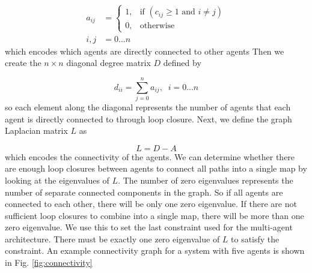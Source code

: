 \documentclass[letterpaper, 10 pt, conference]{ieeeconf}  %
\begin{document}
\begin{align}
  a_{ij} &=
  \begin{cases}
    1, & \text{if } (c_{ij} \geq 1 \text{ and } i \neq j)\\
    0, & \text{otherwise}
  \end{cases}\\
  i,j &=0 ...n \nonumber
\end{align}
%
which encodes which agents are directly connected to other agents
Then we create the $n \times n$ diagonal degree matrix $D$ defined by

\begin{equation}
  d_{ii} = \sum_{j=0}^{n} a_{ij},\;\; i = 0 ... n \nonumber
\end{equation}
%
so each element along the diagonal represents the number of agents that each agent is directly connected to through loop closure. Next, we define the graph Laplacian matrix $L$ as

\begin{equation}
  L = D-A
\end{equation}
%
which encodes the connectivity of the agents. We can determine whether there are enough loop closures between agents to connect all paths into a single map by looking at the eigenvalues of $L$. The number of zero eigenvalues represents the number of separate connected components in the graph. So if all agents are connected to each other, there will be only one zero eigenvalue. If there are not sufficient loop closures to combine into a single map, there will be more than one zero eigenvalue. We use this to set the last constraint used for the multi-agent architecture. There must be exactly one zero eigenvalue of $L$ to satisfy the constraint. An example connectivity graph for a system with five agents is shown in Fig. \ref{fig:connectivity}
\end{document}
